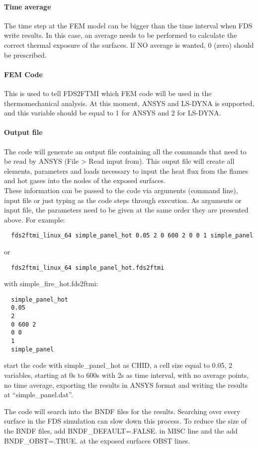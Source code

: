 \documentclass[11pt]{book}
\begin{document}
\paragraph{Time average} 
The time step at the FEM model can be bigger than the time interval when FDS write results. In this case, an average needs to be performed to calculate the correct thermal exposure of the surfaces. If NO average is wanted, 0 (zero) should be prescribed.  
\paragraph{FEM Code}
This is used to tell FDS2FTMI which FEM code will be used in the thermomechanical analysis. At this moment, A{\footnotesize NSYS} and LS-DYNA is supported, and this variable should be equal to 1 for A{\footnotesize NSYS} and 2 for LS-DYNA.
\paragraph{Output file}
The code will generate an output file containing all the commands that need to be read by A{\footnotesize NSYS} (File > Read input from). This ouput file will create all elements, parameters and loads necessary to input the heat flux from the flames and hot gases into the nodes of the exposed surfaces. \\

These information can be passed to the code via arguments (command line), input file or just typing as the code steps through execution. As arguments or input file, the parameters need to be given at the same order they are presented above. For example:
\begin{verbatim}
  fds2ftmi_linux_64 simple_panel_hot 0.05 2 0 600 2 0 0 1 simple_panel
\end{verbatim}
  or 
\begin{verbatim}
  fds2ftmi_linux_64 simple_panel_hot.fds2ftmi 
\end{verbatim}
with simple\_fire\_hot.fds2ftmi:
\begin{verbatim}
  simple_panel_hot 
  0.05 
  2
  0 600 2 
  0 0
  1
  simple_panel
\end{verbatim}
start the code with simple\_panel\_hot as {\ct CHID}, a cell size equal to 0.05, 2 variables, starting at 0s to 600s with 2s as time interval, with no average points, no time average, exporting the results in A{\footnotesize NSYS} format and writing the results at ``simple\_panel.dat''.

The code will search into the {\ct BNDF} files for the results. Searching over every surface in the FDS simulation can slow down this process. To reduce the size of the {\ct BNDF} files, add {\ct BNDF\_DEFAULT=.FALSE.} in {\ct MISC} line and the add {\ct BNDF\_OBST=.TRUE.} at the exposed surfaces {\ct OBST} lines.
\end{document}
